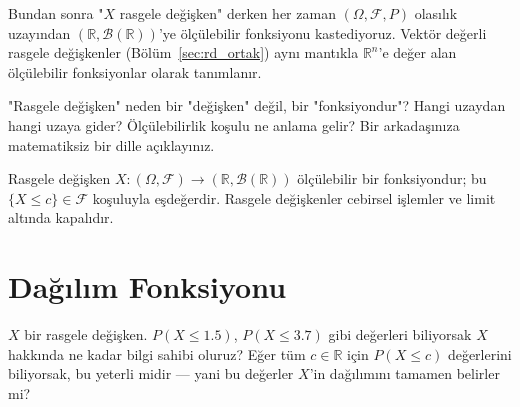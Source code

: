 \begin{hocanotu}
Bundan sonra "$X$ rasgele değişken" derken her zaman
$(\Omega, \mathcal{F}, P)$ olasılık uzayından $(\mathbb{R}, \mathcal{B}(\mathbb{R}))$'ye
ölçülebilir fonksiyonu kastediyoruz. Vektör değerli rasgele değişkenler
(Bölüm~\ref{sec:rd_ortak}) aynı mantıkla $\mathbb{R}^n$'e değer alan ölçülebilir
fonksiyonlar olarak tanımlanır.
\end{hocanotu}

\begin{kendinleifade}
"Rasgele değişken" neden bir "değişken" değil, bir "fonksiyondur"?
Hangi uzaydan hangi uzaya gider? Ölçülebilirlik koşulu ne anlama gelir?
Bir arkadaşınıza matematiksiz bir dille açıklayınız.
\end{kendinleifade}

\begin{mikroozet}
Rasgele değişken $X : (\Omega, \mathcal{F}) \to (\mathbb{R}, \mathcal{B}(\mathbb{R}))$
ölçülebilir bir fonksiyondur; bu $\{X \leq c\} \in \mathcal{F}$ koşuluyla
eşdeğerdir. Rasgele değişkenler cebirsel işlemler ve limit altında kapalıdır.
\end{mikroozet}

\section{Dağılım Fonksiyonu}
\label{sec:dagilim_fonksiyonu}

\begin{kesif}
$X$ bir rasgele değişken. $P(X \leq 1.5)$, $P(X \leq 3.7)$ gibi değerleri
biliyorsak $X$ hakkında ne kadar bilgi sahibi oluruz?
Eğer tüm $c \in \mathbb{R}$ için $P(X \leq c)$ değerlerini biliyorsak,
bu yeterli midir --- yani bu değerler $X$'in dağılımını tamamen belirler mi?
\end{kesif}

